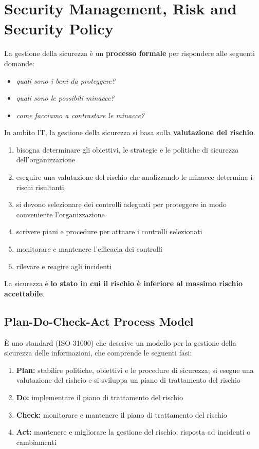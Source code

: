 \chapter{Security Management, Risk and Security Policy}

La gestione della sicurezza è un \textbf{processo formale} per rispondere 
alle seguenti domande:
\begin{itemize}
    \item \textit{quali sono i beni da proteggere?}
    \item \textit{quali sono le possibili minacce?}
    \item \textit{come facciamo a contrastare le minacce?}
\end{itemize}
In ambito IT, la gestione della sicurezza si basa sulla \textbf{valutazione del rischio}.
\begin{enumerate}
    \item bisogna determinare gli obiettivi, le strategie e le politiche 
    di sicurezza dell'organizzazione
    \item eseguire una valutazione del rischio che analizzando le minacce
    determina i rischi risultanti
    \item si devono selezionare dei controlli adeguati per proteggere
    in modo conveniente l'organizzazione
    \item scrivere piani e procedure per attuare i controlli selezionati
    \item monitorare e mantenere l'efficacia dei controlli
    \item rilevare e reagire agli incidenti
\end{enumerate}

La sicurezza è \textbf{lo stato in cui il rischio è inferiore
al massimo rischio accettabile}.


\section{Plan-Do-Check-Act Process Model}
È uno standard (ISO 31000) che descrive un modello per la gestione della sicurezza delle
informazioni, che comprende le seguenti fasi:
\begin{enumerate}
    \item \textbf{Plan:} stabilire politiche, obiettivi e le procedure di sicurezza; si esegue una valutazione del rishcio 
    e si sviluppa un piano di trattamento del rischio
    \item \textbf{Do:} implementare il piano di trattamento del rischio
    \item \textbf{Check:} monitorare e mantenere il piano di trattamento del rischio
    \item \textbf{Act:} mantenere e migliorare la gestione del rischio; risposta ad incidenti o cambiamenti
\end{enumerate}

